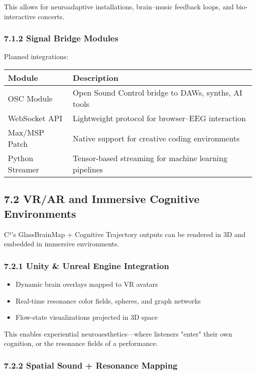\documentclass[10pt]{article}
\begin{document}
This allows for neuroadaptive installations, brain–music feedback loops, and bio-interactive concerts.

\subsubsection*{7.1.2 Signal Bridge Modules}

Planned integrations:

\begin{center}
\begin{tabular}{|l|p{9cm}|}
\hline
\textbf{Module} & \textbf{Description} \\
\hline
OSC Module & Open Sound Control bridge to DAWs, synths, AI tools \\
WebSocket API & Lightweight protocol for browser–EEG interaction \\
Max/MSP Patch & Native support for creative coding environments \\
Python Streamer & Tensor-based streaming for machine learning pipelines \\
\hline
\end{tabular}
\end{center}

\subsection*{7.2 VR/AR and Immersive Cognitive Environments}

C³’s GlassBrainMap + Cognitive Trajectory outputs can be rendered in 3D and embedded in immersive environments.

\subsubsection*{7.2.1 Unity \& Unreal Engine Integration}

\begin{itemize}
    \item Dynamic brain overlays mapped to VR avatars
    \item Real-time resonance color fields, spheres, and graph networks
    \item Flow-state visualizations projected in 3D space
\end{itemize}

This enables experiential neuroaesthetics—where listeners "enter" their own cognition, or the resonance fields of a performance.

\subsubsection*{7.2.2 Spatial Sound + Resonance Mapping}
\end{document}
